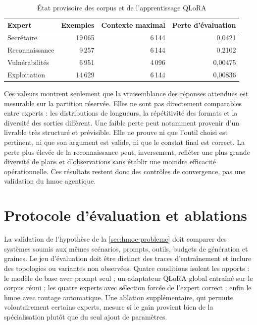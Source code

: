 \begin{table}[H]
  \centering
  \caption{État provisoire des corpus et de l'apprentissage QLoRA}
  \label{tab:hmoe-apprentissage}
  \begin{tabular}{lrrr}
    \toprule
    Expert & Exemples & Contexte maximal & Perte d'évaluation \\
    \midrule
    Secrétaire & 19\,065 & 6\,144 & 0,0421 \\
    Reconnaissance & 9\,257 & 6\,144 & 0,2102 \\
    Vulnérabilités & 6\,951 & 4\,096 & 0,00475 \\
    Exploitation & 14\,629 & 6\,144 & 0,00836 \\
    \bottomrule
  \end{tabular}
\end{table}

Ces valeurs montrent seulement que la vraisemblance des réponses attendues est
mesurable sur la partition réservée. Elles ne sont pas directement comparables
entre experts : les distributions de longueurs, la répétitivité des formats et
la diversité des sorties diffèrent. Une faible perte peut notamment provenir
d'un livrable très structuré et prévisible. Elle ne prouve ni que l'outil choisi
est pertinent, ni que son argument est valide, ni que le constat final est
correct. La perte plus élevée de la reconnaissance peut, inversement, refléter
une plus grande diversité de plans et d'observations sans établir une moindre
efficacité opérationnelle. Ces résultats restent donc des contrôles de
convergence, pas une validation du \gls{hmoe} agentique.

\section{Protocole d'évaluation et ablations}
\label{sec:hmoe-evaluation}

La validation de l'hypothèse de la \cref{sec:hmoe-probleme} doit comparer des
systèmes soumis aux mêmes scénarios, prompts, outils, budgets de génération et
graines. Le jeu d'évaluation doit être distinct des traces d'entraînement et
inclure des topologies ou variantes non observées. Quatre conditions isolent
les apports : le modèle de base avec prompt seul ; un adaptateur QLoRA global
entraîné sur le corpus réuni ; les quatre experts avec sélection forcée de
l'expert correct ; enfin le \gls{hmoe} avec routage automatique. Une ablation
supplémentaire, qui permute volontairement certains experts, mesure si le gain
provient bien de la spécialisation plutôt que du seul ajout de paramètres.

